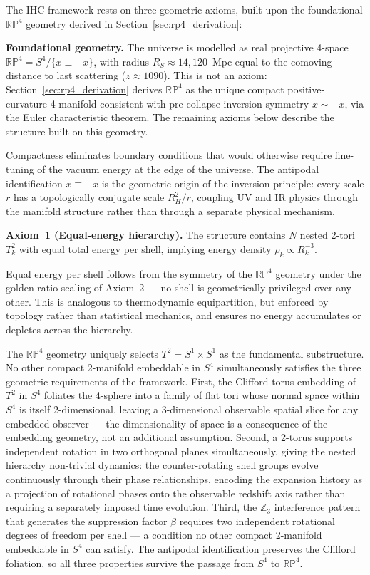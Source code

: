 \documentclass[12pt,a4paper]{article}
\begin{document}
The IHC framework rests on three geometric axioms, built upon the foundational
$\mathbb{RP}^4$ geometry derived in Section~\ref{sec:rp4_derivation}:

\textbf{Foundational geometry.} The universe is modelled as real projective
4-space $\mathbb{RP}^4 = S^4/\{x \equiv -x\}$, with radius $R_S \approx
14{,}120$~Mpc equal to the comoving distance to last scattering
($z \approx 1090$). This is not an axiom: Section~\ref{sec:rp4_derivation}
derives $\mathbb{RP}^4$ as the unique compact positive-curvature 4-manifold
consistent with pre-collapse inversion symmetry $x \sim -x$, via the Euler
characteristic theorem. The remaining axioms below describe the structure
built on this geometry.

Compactness eliminates boundary conditions that would otherwise require
fine-tuning of the vacuum energy at the edge of the universe. The antipodal
identification $x \equiv -x$ is the geometric origin of the inversion
principle: every scale $r$ has a topologically conjugate scale $R_H^2/r$,
coupling UV and IR physics through the manifold structure rather than through
a separate physical mechanism.

\textbf{Axiom~1 (Equal-energy hierarchy).} The structure contains $N$ nested 2-tori
$T_k^2$ with equal total energy per shell, implying energy density
$\rho_k \propto R_k^{-3}$.

Equal energy per shell follows from the symmetry of the $\mathbb{RP}^4$
geometry under the golden ratio scaling of Axiom~2 --- no shell is
geometrically privileged over any other. This is analogous to thermodynamic
equipartition, but enforced by topology rather than statistical mechanics,
and ensures no energy accumulates or depletes across the hierarchy.

The $\mathbb{RP}^4$ geometry uniquely selects $T^2 = S^1 \times S^1$ as the
fundamental substructure. No other compact 2-manifold embeddable in $S^4$
simultaneously satisfies the three geometric requirements of the framework.
First, the Clifford torus embedding of $T^2$ in $S^4$ foliates the 4-sphere
into a family of flat tori whose normal space within $S^4$ is itself
2-dimensional, leaving a 3-dimensional observable spatial slice for any
embedded observer --- the dimensionality of space is a consequence of the
embedding geometry, not an additional assumption. Second, a 2-torus supports
independent rotation in two orthogonal planes simultaneously, giving the
nested hierarchy non-trivial dynamics: the counter-rotating shell groups
evolve continuously through their phase relationships, encoding the expansion
history as a projection of rotational phases onto the observable redshift axis
rather than requiring a separately imposed time evolution. Third, the
$\mathbb{Z}_3$ interference pattern that generates the suppression factor
$\beta$ requires two independent rotational degrees of freedom per shell ---
a condition no other compact 2-manifold embeddable in $S^4$ can satisfy. The
antipodal identification preserves the Clifford foliation, so all
three properties survive the passage from $S^4$ to $\mathbb{RP}^4$.
\end{document}
